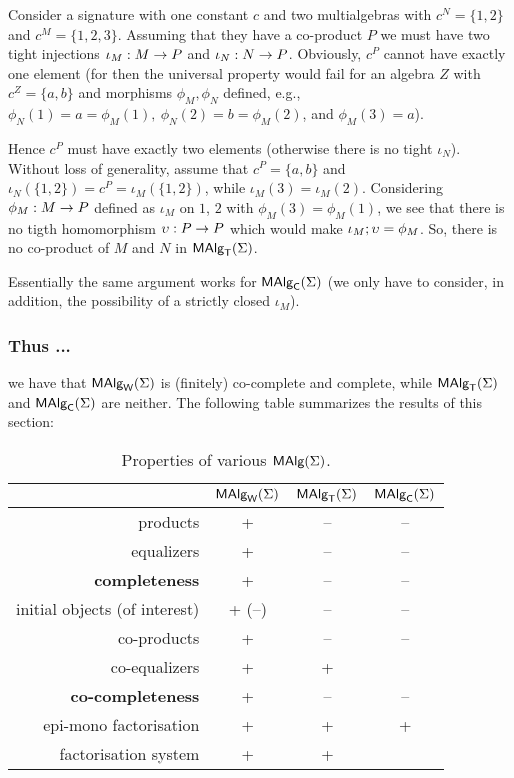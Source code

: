 \documentclass[10pt]{article}
\begin{document}
\begin{Proof}
Consider a signature with one constant $c$ and two multialgebras with
$c^N=\{1,2\}$ and $c^M=\{1,2,3\}$. Assuming that they have a
co-product $P$ we must have two tight injections $\iota_M:M\rightarrow P$
and $\iota_N:N\rightarrow P$. Obviously, $c^P$ cannot have exactly one
element (for then the universal property would fail for an algebra $Z$
with $c^Z=\{a,b\}$ and morphisms $\phi_M,\phi_N$ defined, e.g.,
$\phi_N(1)=a=\phi_M(1),\ \phi_N(2)=b=\phi_M(2)$, and $\phi_M(3)=a$).

Hence $c^P$ must have exactly two elements (otherwise there is no
tight $\iota_N$).  Without loss of generality, assume that
$c^P=\{a,b\}$ and $\iota_N(\{1,2\})=c^P=\iota_M(\{1,2\})$, while
$\iota_M(3)=\iota_M(2)$.  Considering $\phi_M:M\rightarrow P$ defined as
$\iota_M$ on $1$, $2$ with $\phi_M(3)=\phi_M(1)$, we see that there is
no tigth homomorphism $\upsilon:P\rightarrow P$ which would make
$\iota_M;\upsilon=\phi_M$. So, there is no co-product of $M$ and $N$
in $\mbox{\rm\sf MAlg}_{\sf T}(\Sigma)$.

Essentially the same argument works for $\mbox{\rm\sf MAlg}_{\sf C}(\Sigma)$ (we only have to
consider, in addition, the possibility of a strictly closed
$\iota_M$).
\end{Proof}

\subsubsection*{Thus ...} 

we have that $\mbox{\rm\sf MAlg}_{\sf W}(\Sigma)$ is (finitely) co-complete and complete, 
while $\mbox{\rm\sf MAlg}_{\sf T}(\Sigma)$ and $\mbox{\rm\sf MAlg}_{\sf C}(\Sigma)$ are neither.
The following table summarizes the results of this section:

\begin{table}[htb]
\begin{center}
\begin{tabular}{|r|c|c|c|}
\hline 
                   & $\mbox{\rm\sf MAlg}_{\sf W}(\Sigma)$ & $\mbox{\rm\sf MAlg}_{\sf T}(\Sigma)$ & $\mbox{\rm\sf MAlg}_{\sf C}(\Sigma)$ \\ \hline
products           & +  & -- & -- \\
equalizers         & +  & -- & -- \\
{\bf completeness} & +  & -- & --  \\ \hline
initial objects (of interest) & + (--) & -- & -- \\
co-products        & +  & --  &  -- \\
co-equalizers      & +  & +  &  \\
{\bf co-completeness} & +  & -- & -- \\ \hline
epi-mono factorisation & +  & +  & + \\ 
factorisation system & +  & +  &  \\ \hline %
\end{tabular}
\end{center}
\caption{Properties of various $\mbox{\rm\sf MAlg}(\Sigma)$.}\label{tab:A} \vspace*{-3ex}
\end{table}
\end{document}

